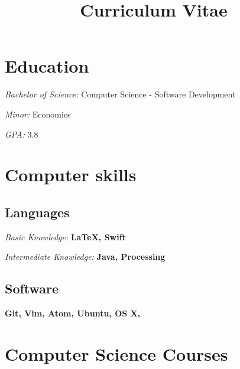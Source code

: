 \documentclass[11pt,a4paper,sans]{moderncv} %
\title{Curriculum Vitae}
\begin{document}
\makecvtitle %

\section{Education}

{\textit{Bachelor of Science: }{Computer Science - Software Development}}

{\textit{Minor: }{Economics}

{\textit{GPA: }{3.8}

\section{Computer skills}

\subsection{Languages}
{\textit{Basic Knowledge: }{\textbf{LaTeX, Swift}}}

{\textit{Intermediate Knowledge: }{\textbf{Java, Processing}}}

\subsection{Software}
{\textbf{Git, Vim, Atom, Ubuntu, OS X,}}

\section{Computer Science Courses}

}}
\end{document}
